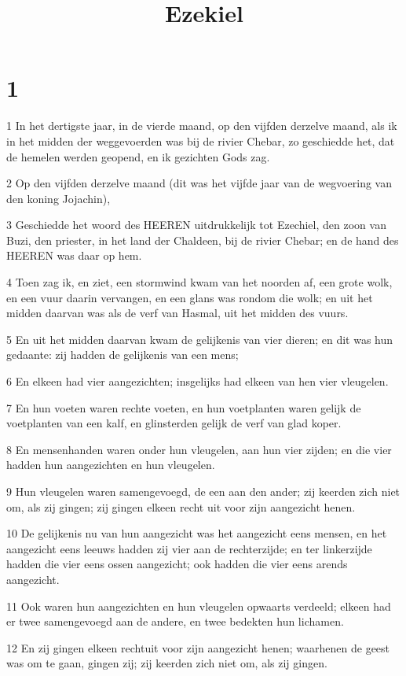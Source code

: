 

\title{Ezekiel}



\chapter{1}

\par 1 In het dertigste jaar, in de vierde maand, op den vijfden derzelve maand, als ik in het midden der weggevoerden was bij de rivier Chebar, zo geschiedde het, dat de hemelen werden geopend, en ik gezichten Gods zag.
\par 2 Op den vijfden derzelve maand (dit was het vijfde jaar van de wegvoering van den koning Jojachin),
\par 3 Geschiedde het woord des HEEREN uitdrukkelijk tot Ezechiel, den zoon van Buzi, den priester, in het land der Chaldeen, bij de rivier Chebar; en de hand des HEEREN was daar op hem.
\par 4 Toen zag ik, en ziet, een stormwind kwam van het noorden af, een grote wolk, en een vuur daarin vervangen, en een glans was rondom die wolk; en uit het midden daarvan was als de verf van Hasmal, uit het midden des vuurs.
\par 5 En uit het midden daarvan kwam de gelijkenis van vier dieren; en dit was hun gedaante: zij hadden de gelijkenis van een mens;
\par 6 En elkeen had vier aangezichten; insgelijks had elkeen van hen vier vleugelen.
\par 7 En hun voeten waren rechte voeten, en hun voetplanten waren gelijk de voetplanten van een kalf, en glinsterden gelijk de verf van glad koper.
\par 8 En mensenhanden waren onder hun vleugelen, aan hun vier zijden; en die vier hadden hun aangezichten en hun vleugelen.
\par 9 Hun vleugelen waren samengevoegd, de een aan den ander; zij keerden zich niet om, als zij gingen; zij gingen elkeen recht uit voor zijn aangezicht henen.
\par 10 De gelijkenis nu van hun aangezicht was het aangezicht eens mensen, en het aangezicht eens leeuws hadden zij vier aan de rechterzijde; en ter linkerzijde hadden die vier eens ossen aangezicht; ook hadden die vier eens arends aangezicht.
\par 11 Ook waren hun aangezichten en hun vleugelen opwaarts verdeeld; elkeen had er twee samengevoegd aan de andere, en twee bedekten hun lichamen.
\par 12 En zij gingen elkeen rechtuit voor zijn aangezicht henen; waarhenen de geest was om te gaan, gingen zij; zij keerden zich niet om, als zij gingen.
